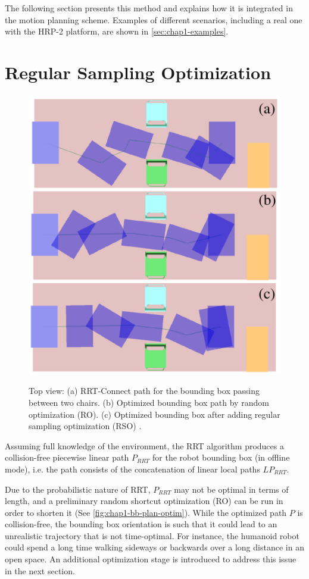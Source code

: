 The following section presents this method and explains how it is
integrated in the motion planning scheme. Examples of different
scenarios, including a real one with the HRP-2 platform, are shown in
\autoref{sec:chap1-examples}.

\section{Regular Sampling Optimization}
\label{sec:chap1-regular-sampling-optim}

\begin{figure}
  \centering
      {\includegraphics[width = 0.8\linewidth]
        {src/chap1-path-optimization/bb-plan-optim.pdf}}
      \caption{Top view: (a) RRT-Connect path for the bounding box
        passing between two chairs. (b) Optimized bounding box path by
        random optimization (RO). (c) Optimized bounding box after
        adding regular sampling optimization (RSO) .}
      \label{fig:chap1-bb-plan-optim}
\end{figure}

Assuming full knowledge of the environment, the RRT algorithm produces
a collision-free piecewise linear path $P_{RRT}$ for the robot
bounding box (in offline mode), i.e. the path consists of the
concatenation of linear local paths $LP_{RRT}$.

Due to the probabilistic nature of RRT, $P_{RRT}$ may not be optimal
in terms of length, and a preliminary random shortcut optimization
(RO) can be run in order to shorten it (See
\autoref{fig:chap1-bb-plan-optim}). While the optimized path $P$ is
collision-free, the bounding box orientation is such that it could
lead to an unrealistic trajectory that is not time-optimal. For
instance, the humanoid robot could spend a long time walking sideways
or backwards over a long distance in an open space. An additional
optimization stage is introduced to address this issue in the next
section.

